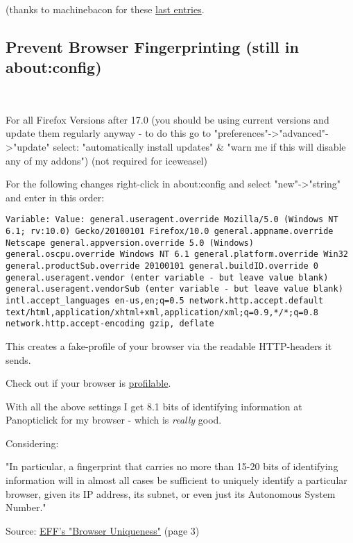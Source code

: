 \documentclass{article}
\begin{document}
 (thanks to machinebacon for these \href{http://crunchbanglinux.org/wiki/iceweasel}{last entries}.
\subsection{Prevent Browser Fingerprinting (still in about:config)}


 ~ ~ ~ ~ ~ ~ ~ ~ ~ ~ ~ ~ ~ ~ ~ ~ ~ ~ ~ ~ ~ ~ 

For all Firefox Versions after 17.0 (you should be using current versions and update them regularly anyway - to do this go to "preferences"->"advanced"->"update" select: "automatically install updates" \& "warn me if this will disable any of my addons") (not required for iceweasel)


 For the following changes right-click in about:config and select "new"->"string" and enter in this order: 
\begin{lstlisting}
Variable: Value: general.useragent.override Mozilla/5.0 (Windows NT 6.1; rv:10.0) Gecko/20100101 Firefox/10.0 general.appname.override Netscape general.appversion.override 5.0 (Windows) general.oscpu.override Windows NT 6.1 general.platform.override Win32 general.productSub.override 20100101 general.buildID.override 0 general.useragent.vendor (enter variable - but leave value blank) general.useragent.vendorSub (enter variable - but leave value blank) intl.accept_languages en-us,en;q=0.5 network.http.accept.default text/html,application/xhtml+xml,application/xml;q=0.9,*/*;q=0.8 network.http.accept-encoding gzip, deflate
\end{lstlisting}



 This creates a fake-profile of your browser via the readable HTTP-headers it sends. 


 Check out if your browser is \href{https://panopticlick.eff.org/}{profilable}.


 With all the above settings I get 8.1 bits of identifying information at Panopticlick for my browser - which is \emph{really} good. 


 Considering:


 "In particular, a fingerprint that carries no more than 15-20 bits of identifying information will in almost all cases be sufficient to uniquely identify a particular browser, given its IP address, its subnet, or even just its Autonomous System Number."


 Source: \href{https://panopticlick.eff.org/browser-uniqueness.pdf}{EFF's "Browser Uniqueness"} (page 3)
\end{document}
